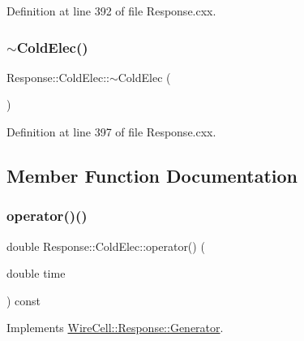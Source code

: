 Definition at line 392 of file Response.\+cxx.

\mbox{\label{class_wire_cell_1_1_response_1_1_cold_elec_aa62302560d96329266f70e331350a957}} 
\subsubsection{\texorpdfstring{$\sim$\+Cold\+Elec()}{~ColdElec()}}
{\footnotesize\ttfamily Response\+::\+Cold\+Elec\+::$\sim$\+Cold\+Elec (\begin{DoxyParamCaption}{ }\end{DoxyParamCaption})\hspace{0.3cm}{\ttfamily [virtual]}}



Definition at line 397 of file Response.\+cxx.



\subsection{Member Function Documentation}
\mbox{\label{class_wire_cell_1_1_response_1_1_cold_elec_a488dd88ca0566ba96fbd9df9c6d3e9b7}} 
\subsubsection{\texorpdfstring{operator()()}{operator()()}}
{\footnotesize\ttfamily double Response\+::\+Cold\+Elec\+::operator() (\begin{DoxyParamCaption}\item[{double}]{time }\end{DoxyParamCaption}) const\hspace{0.3cm}{\ttfamily [virtual]}}



Implements \hyperlink{class_wire_cell_1_1_response_1_1_generator_a216d7f7bd22a1a781b6b00bd988e0136}{Wire\+Cell\+::\+Response\+::\+Generator}.



